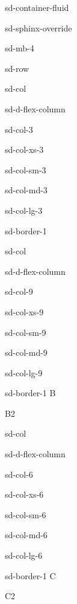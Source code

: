 \documentclass[letterpaper,10pt,english]{jupyterBook}
\begin{document}
\begin{sphinxuseclass}{sd-container-fluid}
\begin{sphinxuseclass}{sd-sphinx-override}
\begin{sphinxuseclass}{sd-mb-4}
\begin{sphinxuseclass}{sd-row}
\begin{sphinxuseclass}{sd-col}
\begin{sphinxuseclass}{sd-d-flex-column}
\begin{sphinxuseclass}{sd-col-3}
\begin{sphinxuseclass}{sd-col-xs-3}
\begin{sphinxuseclass}{sd-col-sm-3}
\begin{sphinxuseclass}{sd-col-md-3}
\begin{sphinxuseclass}{sd-col-lg-3}
\begin{sphinxuseclass}{sd-border-1}
\end{sphinxuseclass}
\end{sphinxuseclass}
\end{sphinxuseclass}
\end{sphinxuseclass}
\end{sphinxuseclass}
\end{sphinxuseclass}
\end{sphinxuseclass}
\end{sphinxuseclass}
\begin{sphinxuseclass}{sd-col}
\begin{sphinxuseclass}{sd-d-flex-column}
\begin{sphinxuseclass}{sd-col-9}
\begin{sphinxuseclass}{sd-col-xs-9}
\begin{sphinxuseclass}{sd-col-sm-9}
\begin{sphinxuseclass}{sd-col-md-9}
\begin{sphinxuseclass}{sd-col-lg-9}
\begin{sphinxuseclass}{sd-border-1}
\sphinxAtStartPar
B

\sphinxAtStartPar
B2

\end{sphinxuseclass}
\end{sphinxuseclass}
\end{sphinxuseclass}
\end{sphinxuseclass}
\end{sphinxuseclass}
\end{sphinxuseclass}
\end{sphinxuseclass}
\end{sphinxuseclass}
\begin{sphinxuseclass}{sd-col}
\begin{sphinxuseclass}{sd-d-flex-column}
\begin{sphinxuseclass}{sd-col-6}
\begin{sphinxuseclass}{sd-col-xs-6}
\begin{sphinxuseclass}{sd-col-sm-6}
\begin{sphinxuseclass}{sd-col-md-6}
\begin{sphinxuseclass}{sd-col-lg-6}
\begin{sphinxuseclass}{sd-border-1}
\sphinxAtStartPar
C

\sphinxAtStartPar
C2


\end{sphinxuseclass}
\end{sphinxuseclass}
\end{sphinxuseclass}
\end{sphinxuseclass}
\end{sphinxuseclass}
\end{sphinxuseclass}
\end{sphinxuseclass}
\end{sphinxuseclass}
\end{sphinxuseclass}
\end{sphinxuseclass}
\end{sphinxuseclass}
\end{sphinxuseclass}
\end{document}
